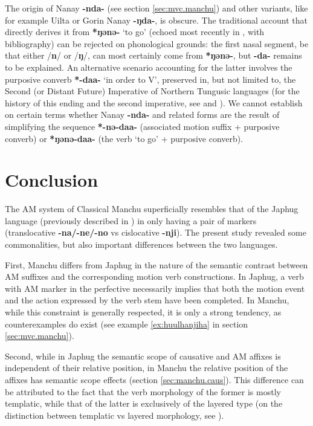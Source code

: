 \documentclass{article}
\newcommand{\ipa}[1]{\textbf{{\phon\mbox{#1}}}} %
\begin{document}
The origin of Nanay \ipa{-nda-} (see section \ref{sec:mvc.manchu}) and other variants, like for example Uilta or Gorin Nanay \ipa{-ŋda-}, is obscure. The traditional account that directly derives it from \ipa{*ŋǝnǝ-} ‘to go’ (echoed most recently in \citealt[93-94]{stojnova16nda}, with bibliography) can be rejected on phonological grounds: the first nasal segment, be that either /\ipa{n}/ or /\ipa{ŋ}/, can most certainly come from \ipa{*ŋǝnǝ-}, but \ipa{-da-} remains to be explained. An alternative scenario accounting for the latter involves the purposive converb \ipa{*-daa-} ‘in order to V’, preserved in, but not limited to, the Second (or Distant Future) Imperative of Northern Tungusic languages (for the history of this ending and the second imperative, see \citealt[135-136,§141]{benzing56tungusischen} and \citealt[54-70]{xasanova86povelitelnoe}). We cannot establish on certain terms whether Nanay \ipa{-nda-} and related forms are the result of simplifying the sequence \ipa{*-nǝ-daa-} (associated motion suffix + purposive converb) or \ipa{*ŋǝnǝ-daa-} (the verb `to go' + purposive converb).

\section*{Conclusion}
The AM system of Classical Manchu superficially resembles that of the Japhug language (previously described in \citealt{jacques13harmonization}) in only having a pair of markers (translocative \ipa{-na/-ne/-no} vs cislocative \ipa{-nji}). The present study revealed some commonalities, but also important differences between the two languages. 

First, Manchu differs from Japhug in the nature of the semantic contrast between AM suffixes and the corresponding motion verb constructions. In Japhug, a verb with AM marker in the perfective necessarily implies that both the motion event and the action expressed by the verb stem have been completed. In Manchu, while this constraint is generally respected, it is only a strong tendency, as counterexamples do exist (see example \ref{ex:huulhanjiha} in section \ref{sec:mvc.manchu}).

Second, while in Japhug the semantic scope of causative and AM affixes is independent of their relative position, in Manchu the relative position of the affixes has semantic scope effects (section \ref{sec:manchu.caus}). This difference can be attributed to the fact that the verb morphology of the former is mostly templatic, while that of the latter is exclusively of the layered type (on the distinction between templatic vs layered morphology, see \citealt{bickel07inflectional}).
\end{document}
